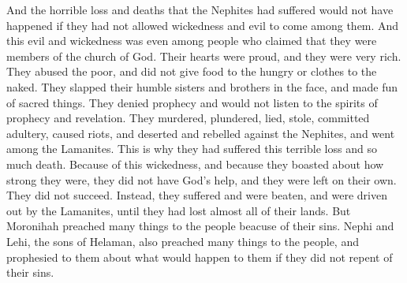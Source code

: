 And the horrible loss and deaths that the Nephites had suffered would not have happened if they had not allowed wickedness and evil to come among them. And this evil and wickedness was even among people who claimed that they were members of the church of God.
\bverse \iffalse And it was because of the pride of their hearts, because of their exceeding riches, yea, it was because of their oppression to the poor, withholding their food from the hungry, withholding their clothing from the naked, and smiting their humble brethren upon the cheek, making a mock of that which was sacred, denying the spirit of prophecy and of revelation, murdering, plundering, lying, stealing, committing adultery, rising up in great contentions, and deserting away into the land of Nephi, among the Lamanites-- \fi
Their hearts were proud, and they were very rich. They abused the poor, and did not give food to the hungry or clothes to the naked. They slapped their humble sisters and brothers in the face, and made fun of sacred things. They denied prophecy and would not listen to the spirits of prophecy and revelation. They murdered, plundered, lied, stole, committed adultery, caused riots, and deserted and rebelled against the Nephites, and went among the Lamanites. This is why they had suffered this terrible loss and so much death.
\bverse \iffalse And because of this their great wickedness, and their boastings in their own strength, they were left in their own strength; therefore they did not prosper, but were afflicted and smitten, and driven before the Lamanites, until they had lost possession of almost all their lands. \fi
Because of this wickedness, and because they boasted about how strong they were, they did not have God's help, and they were left on their own. They did not succeed. Instead, they suffered and were beaten, and were driven out by the Lamanites, until they had lost almost all of their lands.
\bverse \iffalse But behold, Moronihah did preach many things unto the people because of their iniquity, and also Nephi and Lehi, who were the sons of Helaman, did preach many things unto the people, yea, and did prophesy many things unto them concerning their iniquities, and what should come unto them if they did not repent of their sins. \fi
But Moronihah preached many things to the people beacuse of their sins. Nephi and Lehi, the sons of Helaman, also preached many things to the people, and prophesied to them about what would happen to them if they did not repent of their sins.
\bverse \iffalse And it came to pass that they did repent, and inasmuch as they did repent they did begin to prosper. \fi

